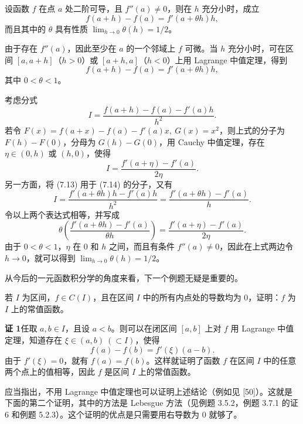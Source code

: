 \begin{xexample}[7.1.4]
设函数 $f$ 在点 $a$ 处二阶可导，且 $f''(a)\neq0$，则在 $h$ 充分小时，成立
\[
  f(a+h)-f(a)=f'(a+\theta h)h,
\]
而且其中的 $\theta$ 具有性质 $\lim_{h\to0}\theta(h)=1/2$。
\end{xexample}
\begin{xproof}
由于存在 $f''(a)$，因此至少在 $a$ 的一个邻域上 $f$ 可微。当 $h$ 充分小时，可在区间 $[a,a+h]$（$h>0$）或 $[a+h,a]$（$h<0$）上用 Lagrange 中值定理，得到
\begin{equation}
  f(a+h)-f(a)=f'(a+\theta h)h,
  \tag{7.13}
\end{equation}
其中 $0<\theta<1$。

考虑分式
\begin{equation}
  I=\frac{f(a+h)-f(a)-f'(a)h}{h^2}.
  \tag{7.14}
\end{equation}
若令 $F(x)=f(a+x)-f(a)-f'(a)x,\ G(x)=x^2$，则上式的分子为 $F(h)-F(0)$，分母为 $G(h)-G(0)$，用 Cauchy 中值定理，存在 $\eta\in(0,h)$ 或 $(h,0)$，使得
\[
  I=\frac{f'(a+\eta)-f'(a)}{2\eta}.
\]
另一方面，将 (7.13) 用于 (7.14) 的分子，又有
\[
  I=\frac{f'(a+\theta h)h-f'(a)h}{h^2}
   =\frac{f'(a+\theta h)-f'(a)}{h}.
\]
令以上两个表达式相等，并写成
\[
  \theta\left(\frac{f'(a+\theta h)-f'(a)}{\theta h}\right)
  =\frac{f'(a+\eta)-f'(a)}{2\eta}.
\]
由于 $0<\theta<1$，$\eta$ 在 $0$ 和 $h$ 之间，而且有条件 $f''(a)\neq0$，因此在上式两边令 $h\to0$，就可以得到 $\lim_{h\to0}\theta(h)=1/2$。
\end{xproof}

从今后的一元函数积分学的角度来看，下一个例题无疑是重要的。

\begin{xexample}[7.1.5]
若 $I$ 为区间，$f\in C(I)$，且在区间 $I$ 中的所有内点处的导数均为 0，证明：$f$ 为 $I$ 上的常值函数。
\end{xexample}
\begin{xproof}
\textbf{证 1}\quad 任取 $a,b\in I$，且设 $a<b$。则可以在闭区间 $[a,b]$ 上对 $f$ 用 Lagrange 中值定理，知道存在 $\xi\in(a,b)\ (\subset I)$，使得
\[
  f(a)-f(b)=f'(\xi)(a-b).
\]
由于 $f'(\xi)=0$，就有 $f(a)=f(b)$。这样就证明了函数 $f$ 在区间 $I$ 中的任意两个点上的值相等，因此 $f$ 是区间 $I$ 上的常值函数。
\end{xproof}

\begin{xremark}
应当指出，不用 Lagrange 中值定理也可以证明上述结论（例如见 [50]）。这就是下面的第二个证明，其中的方法是 Lebesgue 方法（见例题 3.5.2，例题 3.7.1 的证 6 和例题 5.2.3）。这个证明的优点是只需要用右导数为 0 就够了。
\end{xremark}

